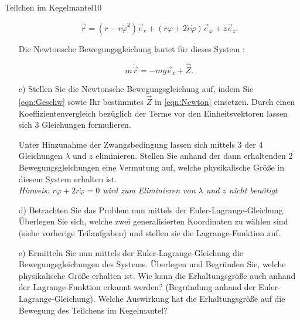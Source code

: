 \begin{exercise}{Teilchen im Kegelmantel}{10}
\begin{enumerate}
    \begin{equation}
      \ddot{\vec{r}} = ( \ddot{r}-r\dot{\varphi}^2)\vec{e}_{r} + (r\ddot{\varphi}
      + 2\dot{r}\dot{\varphi})\vec{e}_{\varphi} + \ddot{z}\vec{e}_{z}.
      \label{eqn:Geschw}
    \end{equation}

    Die Newtonsche Bewegungsgleichung lautet für dieses System :

    \begin{equation}
      m \ddot{\vec{r}} = - mg\vec{e}_{z} + \vec{Z}.
      \label{eqn:Newton}
    \end{equation}

    \item[c)] Stellen Sie die Newtonsche Bewegungsgleichung auf, indem Sie
    \eqref{eqn:Geschw} sowie Ihr bestimmtes $\vec{Z}$ in \eqref{eqn:Newton}
    einsetzen. Durch einen Koeffizientenvergleich bezüglich der Terme vor den
    Einheitsvektoren lassen sich 3 Gleichungen formulieren.

    Unter Hinzunahme der
    Zwangsbedingung lassen sich mittels 3 der 4 Gleichungen $\lambda$ und $z$
    eliminieren. Stellen Sie anhand der dann erhaltenden 2 Bewegungsgleichungen
    eine Vermutung auf, welche physikalische Grö\ss{}e in diesem System erhalten ist.
    \\
    \textit{Hinweis: $r\ddot{\varphi} + 2\dot{r}\dot{\varphi} = 0$ wird zum Eliminieren
    von $\lambda$ und $z$ nicht benötigt}

    \item[d)] Betrachten Sie das Problem nun mittels der Euler-Lagrange-Gleichung.
    Überlegen Sie sich, welche zwei generalisierten Koordinaten zu wählen sind
    (siehe vorherige Teilaufgaben) und stellen sie die Lagrange-Funktion auf.

    \item[e)] Ermitteln Sie nun mittels der Euler-Lagrange-Gleichung die Bewegungsgleichungen
    des Systems. Überlegen und Begründen Sie, welche physikalische Grö\ss{}e erhalten
    ist. Wie kann die Erhaltungsgrö\ss{}e auch anhand der Lagrange-Funktion erkannt
    werden? (Begründung anhand der Euler-Lagrange-Gleichung). Welche Auswirkung
    hat die Erhaltungsgrö\ss{}e auf die Bewegung des Teilchens im Kegelmantel?

  \end{enumerate}
\end{exercise}
